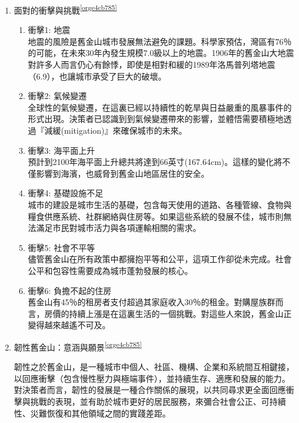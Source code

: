 \documentclass[a4paper,12pt]{article}
\begin{document}
\begin{enumerate}
\begin{enumerate}
\item 面對的衝擊與挑戰\textsuperscript{\ref{orge4cb785}}
\label{sec:org1860913}
\begin{enumerate}
\item 衝擊1: 地震\\
地震的風險是舊金山城市發展無法避免的課題。科學家預估，灣區有76％的可能，在未來30年內發生規模7.0級以上的地震。1906年的舊金山大地震對許多人而言仍心有餘悸，即使是相對和緩的1989年洛馬普列塔地震（6.9），也讓城市承受了巨大的破壞。\\
\item 衝擊2: 氣候變遷\\
全球性的氣候變遷，在這裏已經以持續性的乾旱與日益嚴重的風暴事件的形式出現。決策者已認識到到氣候變遷帶來的影響，並體悟需要積極地透過『減緩(mitigation)』來確保城市的未來。\\
\item 衝擊3: 海平面上升\\
預計到2100年海平面上升總共將達到66英寸(167.64cm)。這樣的變化將不僅影響到海濱，也威脅到舊金山地區居住的安全。\\
\item 衝擊4: 基礎設施不足\\
城市的建設是城市生活的基礎，包含每天使用的道路、各種管線、食物與糧食供應系統、社群網絡與住房等。如果這些系統的發展不佳，城市則無法滿足市民對城市活力與各項運輸相關的需求。\\
\item 衝擊5: 社會不平等\\
儘管舊金山在所有政策中都擁抱平等和公平，這項工作卻從未完成。社會公平和包容性需要成為城市蓬勃發展的核心。\\
\item 衝擊6: 負擔不起的住房\\
舊金山有45％的租房者支付超過其家庭收入30％的租金。對購屋族群而言，房價的持續上漲是在這裏生活的一個挑戰。對這些人來說，舊金山正變得越來越遙不可及。\\
\end{enumerate}

\item 韌性舊金山：意涵與願景\textsuperscript{\ref{orge4cb785}}
\label{sec:org1c12f93}

韌性之於舊金山，是一種城市中個人、社區、機構、企業和系統間互相鍵接，以回應衝擊（包含慢性壓力與極端事件），並持續生存、適應和發展的能力。對決策者而言，韌性的發展是一種合作關係的展現，以共同尋求更全面回應衝擊與挑戰的表現，並有助於城市更好的居民服務，來彌合社會公正、可持續性、災難恢復和其他領域之間的實踐差距。\\


\end{enumerate}
\end{enumerate}
\end{document}
